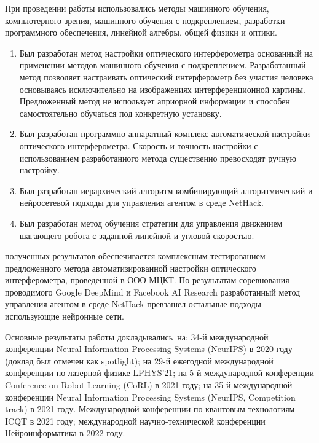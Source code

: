 {\methods} При проведении работы использовались методы машинного обучения, компьютерного зрения, машинного обучения с подкреплением, разработки программного обеспечения, линейной алгебры, общей физики и оптики. 

{}
\begin{enumerate}[beginpenalty=10000] %
  \item Был разработан метод настройки оптического интерферометра основанный на применении методов машинного обучения с подкреплением. Разработанный метод позволяет настраивать оптический интерферометр без участия человека основываясь исключительно на изображениях интерференционной картины. Предложенный метод не использует априорной информации и способен самостоятельно обучаться под конкретную установку.
  \item Был разработан программно-аппаратный комплекс автоматической настройки оптического интерферометра. Скорость и точность настройки с использованием разработанного метода существенно превосходят ручную настройку. 
  \item Был разработан иерархический алгоритм комбинирующий алгоритмический и нейросетевой подходы для управления агентом в среде NetHack.
  \item Был разработан метод обучения стратегии для управления движением шагающего робота с заданной линейной и угловой скоростью. 
\end{enumerate}

{\reliability} полученных результатов обеспечивается комплексным тестированием предложенного метода автоматизированной настройки оптического интерферометра, проведенной в ООО МЦКТ. По результатам 
соревнования проводимого Google DeepMind и Facebook AI Research разработанный метод управления агентом в среде NetHack превзашел остальные подходы использующие нейронные сети. 


{\probation} Основные результаты работы докладывались~на: 34-й международной конференции Neural Information Processing Systems (NeurIPS) в 2020 году (доклад был отмечен как spotlight); на 29-й ежегодной международной конференции по лазерной физике LPHYS'21; на 5-й международной конференции Conference on Robot Learning (CoRL) в 2021 году; на 35-й международной конференции Neural Information Processing Systems (NeurIPS, Competition track) в 2021 году. Международной конференции по квантовым технологиям ICQT в 2021 году; международной научно-технической конференции Нейроинформатика в 2022 году.


